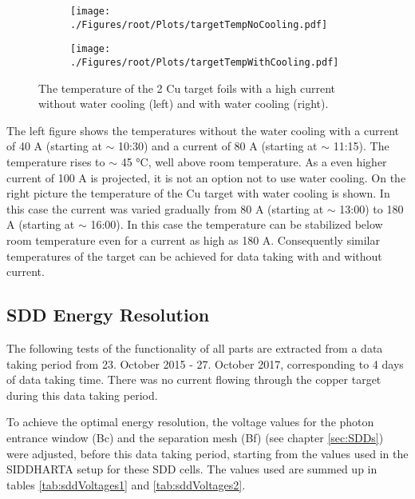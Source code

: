 \begin{figure}[h]
 \centering
 \begin{subfigure}{.49\textwidth}
 \centering
 \texttt{[image: ./Figures/root/Plots/targetTempNoCooling.pdf]}
 \end{subfigure}
 \hfill
 \begin{subfigure}{.49\textwidth}
 \centering
 \texttt{[image: ./Figures/root/Plots/targetTempWithCooling.pdf]}
 \end{subfigure}
 \caption{The temperature of the 2 Cu target foils with a high current without water cooling (left) and with water cooling (right).}
 \label{fig:waterCooling}
\end{figure}
The left figure shows the temperatures without the water cooling with a current of 40 A (starting at $\sim$ 10:30) and a current of 80 A (starting at $\sim$ 11:15). The temperature rises to $\sim$ 45 °C, well above room temperature. As a even higher current of 100 A is projected, it is not an option not to use water cooling. On the right picture the temperature of the Cu target with water cooling is shown. In this case the current was varied gradually from 80 A (starting at $\sim$ 13:00) to 180 A (starting at $\sim$ 16:00). In this case the temperature can be stabilized below room temperature even for a current as high as 180 A. Consequently similar temperatures of the target can be achieved for data taking with and without current.

\subsection{SDD Energy Resolution}

The following tests of the functionality of all parts are extracted from a data taking period from 23. October 2015 - 27. October 2017, corresponding to 4 days of data taking time. There was no current flowing through the copper target during this data taking period.

To achieve the optimal energy resolution, the voltage values for the photon entrance window (Bc) and the separation mesh (Bf) (see chapter \ref{sec:SDDs}) were adjusted, before this data taking period, starting from the values used in the SIDDHARTA setup for these SDD cells. The values used are summed up in tables \ref{tab:sddVoltages1} and \ref{tab:sddVoltages2}.

